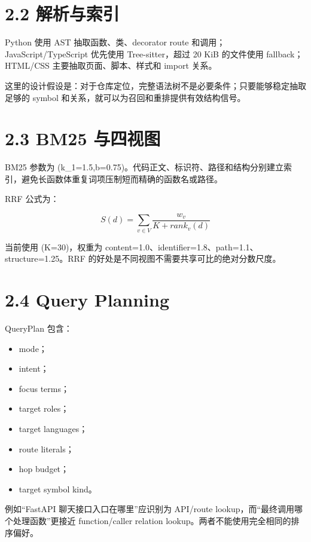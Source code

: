 \documentclass[UTF8,12pt,openany]{ctexbook}
\begin{document}
\section{2.2 解析与索引}

Python 使用 AST 抽取函数、类、decorator route 和调用；JavaScript/TypeScript 优先使用 Tree-sitter，超过 20 KiB 的文件使用 fallback；HTML/CSS 主要抽取页面、脚本、样式和 import 关系。\par

这里的设计假设是：对于仓库定位，完整语法树不是必要条件；只要能够稳定抽取足够的 symbol 和关系，就可以为召回和重排提供有效结构信号。\par

\section{2.3 BM25 与四视图}

BM25 参数为 (k\_1=1.5,b=0.75)。代码正文、标识符、路径和结构分别建立索引，避免长函数体重复词项压制短而精确的函数名或路径。\par

RRF 公式为：\par

\[
S(d)=\sum_{v\in V}\frac{w_v}{K+rank_v(d)}
\]

当前使用 (K=30)，权重为 content=1.0、identifier=1.8、path=1.1、structure=1.25。RRF 的好处是不同视图不需要共享可比的绝对分数尺度。\par

\section{2.4 Query Planning}

QueryPlan 包含：\par

\begin{itemize}
\item mode；
\item intent；
\item focus terms；
\item target roles；
\item target languages；
\item route literals；
\item hop budget；
\item target symbol kind。
\end{itemize}

例如“FastAPI 聊天接口入口在哪里”应识别为 API/route lookup，而“最终调用哪个处理函数”更接近 function/caller relation lookup。两者不能使用完全相同的排序偏好。\par
\end{document}
